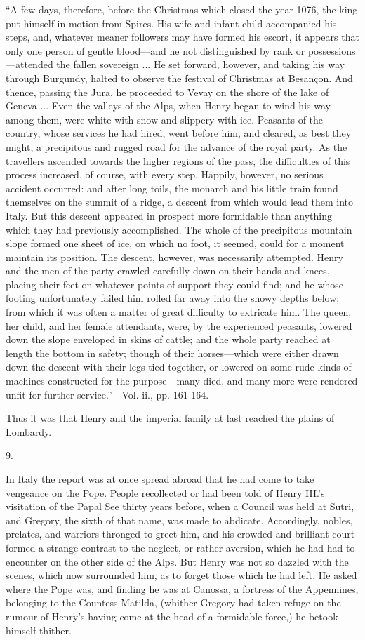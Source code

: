 ``A
few days, therefore, before the Christmas which closed the year 1076,
the king put himself in motion from Spires. His wife and infant child
accompanied his steps, and, whatever meaner followers may have formed
his escort, it appears that only one person of gentle blood—and he
not distinguished by rank or possessions—attended the fallen
sovereign ... He set forward, however, and taking his way through
Burgundy, halted to observe the festival of Christmas at Besançon.
And thence, passing the Jura, he proceeded to Vevay on the shore of
the lake of Geneva ... Even the valleys of the Alps, when Henry began
to wind his way among them, were white with snow and slippery with
ice. Peasants of the country, whose services he had hired, went before
him, and cleared, as best they might, a precipitous and rugged road
for the advance of the royal party. As the travellers ascended towards
the higher regions of the pass, the difficulties of this process
increased, of course, with every step. Happily, however, no serious
accident occurred: and after long toils, the monarch and his little
train found themselves on the summit of a ridge, a descent from which
would lead them into Italy. But this descent appeared in prospect more
formidable than anything which they had previously accomplished. The
whole of the precipitous mountain slope formed one sheet of ice, on
which no foot, it seemed, could for a moment maintain its position.
The descent, however, was necessarily attempted. Henry and the men of
the party crawled carefully down on their hands and knees, placing
their feet on whatever points of support they could find; and he whose
footing unfortunately failed him rolled far away into the snowy depths
below; from which it was often a matter of great difficulty to
extricate him. The queen, her child, and her female attendants, were,
by the experienced peasants, lowered down the slope enveloped in skins
of cattle; and the whole party reached at length the bottom in safety;
though of their horses—which were either drawn down the descent with
their legs tied together, or lowered on some rude kinds of machines
constructed for the purpose—many died, and many more were rendered
unfit for further service.''—Vol. ii., pp. 161-164.

Thus it was that Henry and the imperial family at
last reached the plains of Lombardy.

9.

In Italy the report was at once spread abroad
that he had come to take vengeance on the Pope. People
recollected or had been told of Henry III.'s visitation of the Papal
See thirty years before, when a Council was held at Sutri, and
Gregory, the sixth of that name, was made to abdicate. Accordingly,
nobles, prelates, and warriors thronged to greet him, and his crowded
and brilliant court formed a strange contrast to the neglect, or
rather aversion, which he had had to encounter on the other side of
the Alps. But Henry was not so dazzled with the scenes, which now
surrounded him, as to forget those which he had left. He asked where
the Pope was, and finding he was at Canossa, a fortress of the
Appennines, belonging to the Countess Matilda, (whither Gregory had
taken refuge on the rumour of Henry's having come at the head of a
formidable force,) he betook himself thither.

